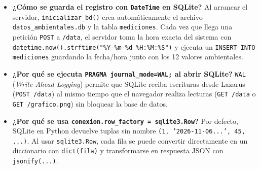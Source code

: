 \documentclass[11pt,a4paper]{article}
\begin{document}
\begin{itemize}[leftmargin=1.5em]
    \item \textbf{¿Cómo se guarda el registro con \texttt{DateTime} en SQLite?}
    Al arrancar el servidor, \texttt{inicializar\_bd()} crea automáticamente el archivo \texttt{datos\_ambientales.db} y la tabla \texttt{mediciones}. Cada vez que llega una petición \texttt{POST} a \texttt{/data}, el servidor toma la hora exacta del sistema con \texttt{datetime.now().strftime("\%Y-\%m-\%d \%H:\%M:\%S")} y ejecuta un \texttt{INSERT INTO mediciones} guardando la fecha/hora junto con los 12 valores ambientales.
    
    \item \textbf{¿Por qué se ejecuta \texttt{PRAGMA journal\_mode=WAL;} al abrir SQLite?}
    \texttt{WAL} (\emph{Write-Ahead Logging}) permite que SQLite reciba escrituras desde Lazarus (\texttt{POST /data}) al mismo tiempo que el navegador realiza lecturas (\texttt{GET /data} o \texttt{GET /grafico.png}) sin bloquear la base de datos.
    
    \item \textbf{¿Por qué se usa \texttt{conexion.row\_factory = sqlite3.Row}?}
    Por defecto, SQLite en Python devuelve tuplas sin nombre \texttt{(1, '2026-11-06...', 45, ...)}. Al usar \texttt{sqlite3.Row}, cada fila se puede convertir directamente en un diccionario con \texttt{dict(fila)} y transformarse en respuesta JSON con \texttt{jsonify(...)}.
    

\end{itemize}
\end{document}
